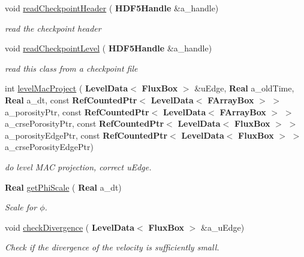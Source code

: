 \begin{DoxyCompactItemize}
void \hyperlink{class_projector_a26da7130c9aad23dd28488c305a8211c}{read\+Checkpoint\+Header} (\textbf{ H\+D\+F5\+Handle} \&a\+\_\+handle)
\begin{DoxyCompactList}\small\item\em read the checkpoint header \end{DoxyCompactList}\item 
\mbox{\label{class_projector_aab6a24828bcc051259ecf12136395e55}} 
void \hyperlink{class_projector_aab6a24828bcc051259ecf12136395e55}{read\+Checkpoint\+Level} (\textbf{ H\+D\+F5\+Handle} \&a\+\_\+handle)
\begin{DoxyCompactList}\small\item\em read this class from a checkpoint file \end{DoxyCompactList}\item 
\mbox{\label{class_projector_aec36d09f7af52f4392aec78bbd865d1d}} 
int \hyperlink{class_projector_aec36d09f7af52f4392aec78bbd865d1d}{level\+Mac\+Project} (\textbf{ Level\+Data}$<$ \textbf{ Flux\+Box} $>$ \&u\+Edge, \textbf{ Real} a\+\_\+old\+Time, \textbf{ Real} a\+\_\+dt, const \textbf{ Ref\+Counted\+Ptr}$<$ \textbf{ Level\+Data}$<$ \textbf{ F\+Array\+Box} $>$ $>$ a\+\_\+porosity\+Ptr, const \textbf{ Ref\+Counted\+Ptr}$<$ \textbf{ Level\+Data}$<$ \textbf{ F\+Array\+Box} $>$ $>$ a\+\_\+crse\+Porosity\+Ptr, const \textbf{ Ref\+Counted\+Ptr}$<$ \textbf{ Level\+Data}$<$ \textbf{ Flux\+Box} $>$ $>$ a\+\_\+porosity\+Edge\+Ptr, const \textbf{ Ref\+Counted\+Ptr}$<$ \textbf{ Level\+Data}$<$ \textbf{ Flux\+Box} $>$ $>$ a\+\_\+crse\+Porosity\+Edge\+Ptr)
\begin{DoxyCompactList}\small\item\em do level M\+AC projection, correct u\+Edge. \end{DoxyCompactList}\item 
\textbf{ Real} \hyperlink{class_projector_a87058c308a90f992ce88a668a65a1a79}{get\+Phi\+Scale} (\textbf{ Real} a\+\_\+dt)
\begin{DoxyCompactList}\small\item\em Scale for $ \phi $. \end{DoxyCompactList}\item 
void \hyperlink{class_projector_ad063e890cdab51aa662c02fc8137cc49}{check\+Divergence} (\textbf{ Level\+Data}$<$ \textbf{ Flux\+Box} $>$ \&a\+\_\+u\+Edge)
\begin{DoxyCompactList}\small\item\em Check if the divergence of the velocity is sufficiently small. \end{DoxyCompactList}\item 

\end{DoxyCompactItemize}
